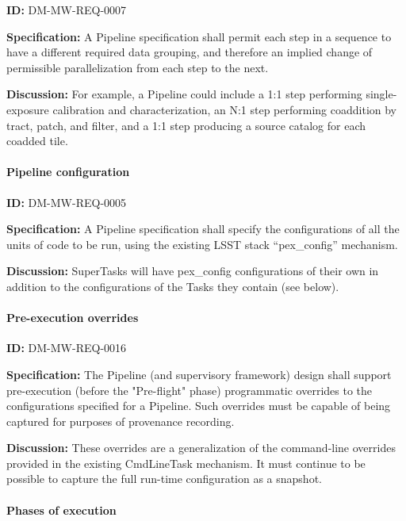 \documentclass[SE,toc,lsstdraft]{lsstdoc}
\begin{document}
\label{DM-MW-REQ-0007}
\textbf{ID:} DM-MW-REQ-0007

\textbf{Specification:}
A Pipeline specification shall permit each step in a sequence to have a different required data grouping, and therefore an implied change of permissible parallelization from each step to the next.

\textbf{Discussion:}
For example, a Pipeline could include a 1:1 step performing single-exposure calibration and characterization, an N:1 step performing coaddition by tract, patch, and filter, and a 1:1 step producing a source catalog for each coadded tile.




\paragraph{Pipeline configuration}\hfill  %

\label{DM-MW-REQ-0005}
\textbf{ID:} DM-MW-REQ-0005

\textbf{Specification:}
A Pipeline specification shall specify the configurations of all the units of code to be run, using the existing LSST stack “pex\_config” mechanism.

\textbf{Discussion:}
SuperTasks will have pex\_config configurations of their own in addition to the configurations of the Tasks they contain (see below).




\paragraph{Pre-execution overrides}\hfill  %

\label{DM-MW-REQ-0016}
\textbf{ID:} DM-MW-REQ-0016

\textbf{Specification:}
The Pipeline (and supervisory framework) design shall support pre-execution (before the "Pre-flight" phase) programmatic overrides to the configurations specified for a Pipeline. Such overrides must be capable of being captured for purposes of provenance recording.

\textbf{Discussion:}
These overrides are a generalization of the command-line overrides provided in the existing CmdLineTask mechanism. It must continue to be possible to capture the full run-time configuration as a snapshot.




\paragraph{Phases of execution}\hfill  %
\end{document}
